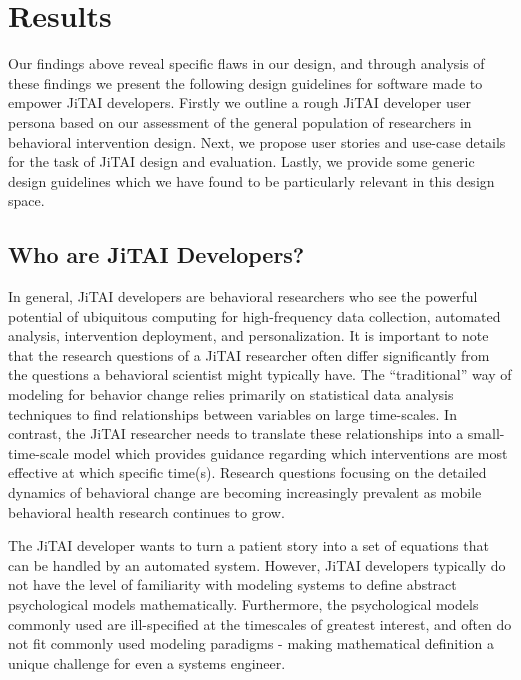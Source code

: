 \documentclass{sigchi}
\begin{document}
\section{Results}
Our findings above reveal specific flaws in our design, and through analysis of these findings we present the following design guidelines for software made to empower JiTAI developers.
Firstly we outline a rough JiTAI developer user persona based on our assessment of the general population of researchers in behavioral intervention design.
Next, we propose user stories and use-case details for the task of JiTAI design and evaluation.
Lastly, we provide some generic design guidelines which we have found to be particularly relevant in this design space.

\subsection{Who are JiTAI Developers?}
In general, JiTAI developers are behavioral researchers who see the powerful potential of ubiquitous computing for high-frequency data collection, automated analysis, intervention deployment, and personalization.
It is important to note that the research questions of a JiTAI researcher often differ significantly from the questions a behavioral scientist might typically have.
The ``traditional'' way of modeling for behavior change relies primarily on statistical data analysis techniques to find relationships between variables on large time-scales.
In contrast, the JiTAI researcher needs to translate these relationships into a small-time-scale model which provides guidance regarding which interventions are most effective at which specific time(s).
Research questions focusing on the detailed dynamics of behavioral change are becoming increasingly prevalent as mobile behavioral health research continues to grow.

The JiTAI developer wants to turn a patient story into a set of equations that can be handled by an automated system.
However, JiTAI developers typically do not have the level of familiarity with modeling systems to define abstract psychological models mathematically.
Furthermore, the psychological models commonly used are ill-specified at the timescales of greatest interest, and often do not fit commonly used modeling paradigms - making mathematical definition a unique challenge for even a systems engineer.
\end{document}
